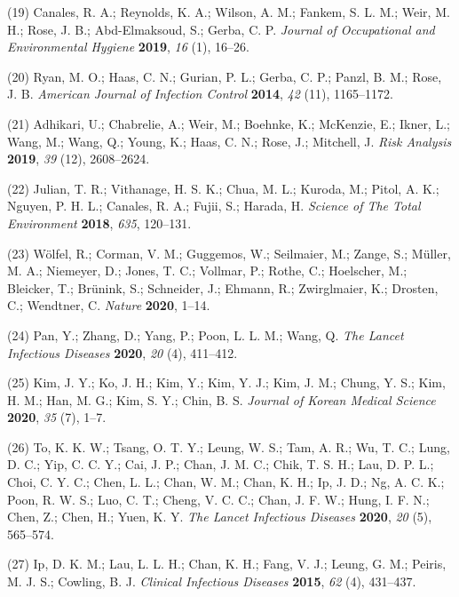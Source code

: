 \documentclass[journal=jacsat,manuscript=article]{achemso}
\begin{document}
\leavevmode\hypertarget{ref-Canales2019}{}%
(19) Canales, R. A.; Reynolds, K. A.; Wilson, A. M.; Fankem, S. L. M.;
Weir, M. H.; Rose, J. B.; Abd-Elmaksoud, S.; Gerba, C. P. \emph{Journal
of Occupational and Environmental Hygiene} \textbf{2019}, \emph{16} (1),
16--26.

\leavevmode\hypertarget{ref-Ryan2014a}{}%
(20) Ryan, M. O.; Haas, C. N.; Gurian, P. L.; Gerba, C. P.; Panzl, B.
M.; Rose, J. B. \emph{American Journal of Infection Control}
\textbf{2014}, \emph{42} (11), 1165--1172.

\leavevmode\hypertarget{ref-Adhikari2019}{}%
(21) Adhikari, U.; Chabrelie, A.; Weir, M.; Boehnke, K.; McKenzie, E.;
Ikner, L.; Wang, M.; Wang, Q.; Young, K.; Haas, C. N.; Rose, J.;
Mitchell, J. \emph{Risk Analysis} \textbf{2019}, \emph{39} (12),
2608--2624.

\leavevmode\hypertarget{ref-Julian2018}{}%
(22) Julian, T. R.; Vithanage, H. S. K.; Chua, M. L.; Kuroda, M.; Pitol,
A. K.; Nguyen, P. H. L.; Canales, R. A.; Fujii, S.; Harada, H.
\emph{Science of The Total Environment} \textbf{2018}, \emph{635},
120--131.

\leavevmode\hypertarget{ref-Wolfel2020}{}%
(23) Wölfel, R.; Corman, V. M.; Guggemos, W.; Seilmaier, M.; Zange, S.;
Müller, M. A.; Niemeyer, D.; Jones, T. C.; Vollmar, P.; Rothe, C.;
Hoelscher, M.; Bleicker, T.; Brünink, S.; Schneider, J.; Ehmann, R.;
Zwirglmaier, K.; Drosten, C.; Wendtner, C. \emph{Nature} \textbf{2020},
1--14.

\leavevmode\hypertarget{ref-Pan2020}{}%
(24) Pan, Y.; Zhang, D.; Yang, P.; Poon, L. L. M.; Wang, Q. \emph{The
Lancet Infectious Diseases} \textbf{2020}, \emph{20} (4), 411--412.

\leavevmode\hypertarget{ref-Kim2020}{}%
(25) Kim, J. Y.; Ko, J. H.; Kim, Y.; Kim, Y. J.; Kim, J. M.; Chung, Y.
S.; Kim, H. M.; Han, M. G.; Kim, S. Y.; Chin, B. S. \emph{Journal of
Korean Medical Science} \textbf{2020}, \emph{35} (7), 1--7.

\leavevmode\hypertarget{ref-To2020}{}%
(26) To, K. K. W.; Tsang, O. T. Y.; Leung, W. S.; Tam, A. R.; Wu, T. C.;
Lung, D. C.; Yip, C. C. Y.; Cai, J. P.; Chan, J. M. C.; Chik, T. S. H.;
Lau, D. P. L.; Choi, C. Y. C.; Chen, L. L.; Chan, W. M.; Chan, K. H.;
Ip, J. D.; Ng, A. C. K.; Poon, R. W. S.; Luo, C. T.; Cheng, V. C. C.;
Chan, J. F. W.; Hung, I. F. N.; Chen, Z.; Chen, H.; Yuen, K. Y.
\emph{The Lancet Infectious Diseases} \textbf{2020}, \emph{20} (5),
565--574.

\leavevmode\hypertarget{ref-Ip2016}{}%
(27) Ip, D. K. M.; Lau, L. L. H.; Chan, K. H.; Fang, V. J.; Leung, G.
M.; Peiris, M. J. S.; Cowling, B. J. \emph{Clinical Infectious Diseases}
\textbf{2015}, \emph{62} (4), 431--437.
\end{document}
